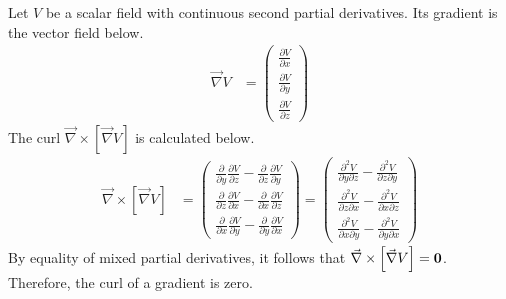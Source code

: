 \begin{answer}
	Let $V$ be a scalar field with continuous second partial derivatives.
	Its gradient is the vector field below.
	\begin{align}
		\vec{\nabla} V & =
		\begin{pmatrix}
			\frac{\partial V}{\partial x} \\
			\frac{\partial V}{\partial y} \\
			\frac{\partial V}{\partial z}
		\end{pmatrix}
	\end{align}
	The curl $\vec{\nabla} \times \left[\vec{\nabla} V\right]$ is calculated below.
	\begin{align*}
		\vec{\nabla} \times \left[\vec{\nabla} V\right] & =
		\begin{pmatrix}
			\frac{\partial}{\partial y} \frac{\partial V}{\partial z} - \frac{\partial}{\partial z} \frac{\partial V}{\partial y} \\
			\frac{\partial}{\partial z} \frac{\partial V}{\partial x} - \frac{\partial}{\partial x} \frac{\partial V}{\partial z} \\
			\frac{\partial}{\partial x} \frac{\partial V}{\partial y} - \frac{\partial}{\partial y} \frac{\partial V}{\partial x}
		\end{pmatrix}
		=
		\begin{pmatrix}
			\frac{\partial^2 V}{\partial y \partial z} - \frac{\partial^2 V}{\partial z \partial y} \\
			\frac{\partial^2 V}{\partial z \partial x} - \frac{\partial^2 V}{\partial x \partial z} \\
			\frac{\partial^2 V}{\partial x \partial y} - \frac{\partial^2 V}{\partial y \partial x}
		\end{pmatrix}
	\end{align*}
	By equality of mixed partial derivatives, it follows that $\vec{\nabla} \times \left[\vec{\nabla} V\right] = \mathbf{0}$.
	Therefore, the curl of a gradient is zero.
\end{answer}

